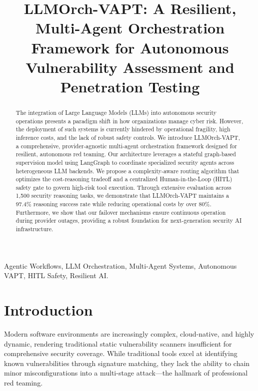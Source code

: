 \documentclass[conference,compsoc]{IEEEtran}
\begin{document}
\title{LLMOrch-VAPT: A Resilient, Multi-Agent Orchestration Framework for Autonomous Vulnerability Assessment and Penetration Testing}

\author{
}

\maketitle

\begin{abstract}
The integration of Large Language Models (LLMs) into autonomous security operations presents a paradigm shift in how organizations manage cyber risk. However, the deployment of such systems is currently hindered by operational fragility, high inference costs, and the lack of robust safety controls. We introduce LLMOrch-VAPT, a comprehensive, provider-agnostic multi-agent orchestration framework designed for resilient, autonomous red teaming. Our architecture leverages a stateful graph-based supervision model using LangGraph to coordinate specialized security agents across heterogeneous LLM backends. We propose a complexity-aware routing algorithm that optimizes the cost-reasoning tradeoff and a centralized Human-in-the-Loop (HITL) safety gate to govern high-risk tool execution. Through extensive evaluation across 1,500 security reasoning tasks, we demonstrate that LLMOrch-VAPT maintains a 97.4\% reasoning success rate while reducing operational costs by over 80\%. Furthermore, we show that our failover mechanisms ensure continuous operation during provider outages, providing a robust foundation for next-generation security AI infrastructure.
\end{abstract}

\begin{IEEEkeywords}
Agentic Workflows, LLM Orchestration, Multi-Agent Systems, Autonomous VAPT, HITL Safety, Resilient AI.
\end{IEEEkeywords}

\section{Introduction}
Modern software environments are increasingly complex, cloud-native, and highly dynamic, rendering traditional static vulnerability scanners insufficient for comprehensive security coverage. While traditional tools excel at identifying known vulnerabilities through signature matching, they lack the ability to chain minor misconfigurations into a multi-stage attack—the hallmark of professional red teaming. 
\end{document}

